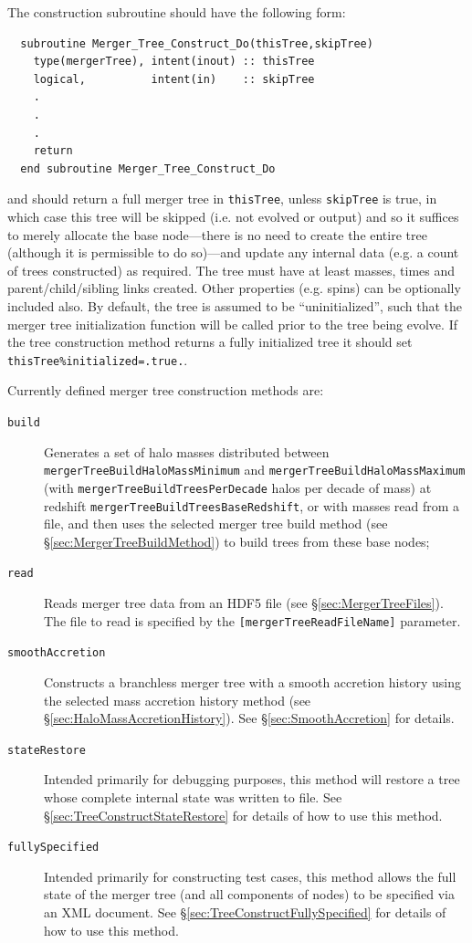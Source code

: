 The construction subroutine should have the following form:
\begin{verbatim}
  subroutine Merger_Tree_Construct_Do(thisTree,skipTree)
    type(mergerTree), intent(inout) :: thisTree
    logical,          intent(in)    :: skipTree
    .
    .
    .
    return
  end subroutine Merger_Tree_Construct_Do
\end{verbatim}
and should return a full merger tree in {\tt thisTree}, unless {\tt skipTree} is true, in which case this tree will be skipped (i.e. not evolved or output) and so it suffices to merely allocate the base node---there is no need to create the entire tree (although it is permissible to do so)---and update any internal data (e.g. a count of trees constructed) as required. The tree must have at least masses, times and parent/child/sibling links created. Other properties (e.g. spins) can be optionally included also. By default, the tree is assumed to be ``uninitialized'', such that the merger tree initialization function will be called prior to the tree being evolve. If the tree construction method returns a fully initialized tree it should set {\tt thisTree\%initialized=.true.}.

Currently defined merger tree construction methods are:
\begin{description}
 \item [{\tt build}] Generates a set of halo masses distributed between {\tt mergerTreeBuildHaloMassMinimum} and {\tt mergerTreeBuildHaloMassMaximum} (with {\tt mergerTreeBuildTreesPerDecade} halos per decade of mass) at redshift {\tt mergerTreeBuildTreesBaseRedshift}, or with masses read from a file, and then uses the selected merger tree build method (see \S\ref{sec:MergerTreeBuildMethod}) to build trees from these base nodes;
 \item [{\tt read}] Reads merger tree data from an HDF5 file (see \S\ref{sec:MergerTreeFiles}). The file to read is specified by the {\tt [mergerTreeReadFileName]} parameter.
 \item [{\tt smoothAccretion}] Constructs a branchless merger tree with a smooth accretion history using the selected mass accretion history method (see \S\ref{sec:HaloMassAccretionHistory}). See \S\ref{sec:SmoothAccretion} for details.
 \item [{\tt stateRestore}] Intended primarily for debugging purposes, this method will restore a tree whose complete internal state was written to file. See \S\ref{sec:TreeConstructStateRestore} for details of how to use this method.
 \item [{\tt fullySpecified}] Intended primarily for constructing test cases, this method allows the full state of the merger tree (and all components of nodes) to be specified via an XML document. See \S\ref{sec:TreeConstructFullySpecified} for details of how to use this method.
\end{description}

